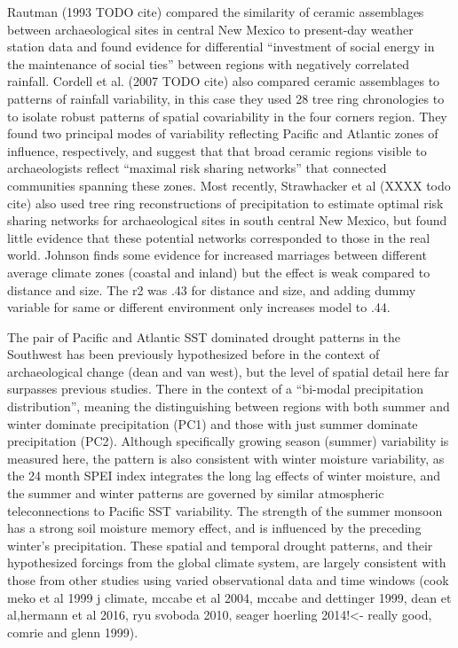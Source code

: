 \documentclass[11pt]{wlscirep}
\begin{document}
Rautman (1993 TODO cite) compared the similarity of ceramic assemblages between archaeological sites in central New Mexico to present-day weather station data and found evidence for differential ``investment of social energy in the maintenance of social ties'' between regions with negatively correlated rainfall. Cordell et al. (2007 TODO cite) also compared ceramic assemblages to patterns of rainfall variability, in this case they used 28 tree ring chronologies to to isolate robust patterns of spatial covariability in the four corners region. They found two principal modes of variability reflecting Pacific and Atlantic zones of influence, respectively, and suggest that that broad ceramic regions visible to archaeologists reflect ``maximal risk sharing networks'' that connected communities spanning these zones. Most recently, Strawhacker et al (XXXX todo cite) also used tree ring reconstructions of precipitation to estimate optimal risk sharing networks for archaeological sites in south central New Mexico, but found little evidence that these potential networks corresponded to those in the real world. Johnson finds some evidence for increased marriages between different average climate zones (coastal and inland) but the effect is weak compared to distance and  size. The r2 was .43 for distance and size, and adding dummy variable for same or different environment only increases model to .44.

The pair of Pacific and Atlantic SST dominated drought patterns in the Southwest has been previously hypothesized before in the context of archaeological change (dean and van west), but the level of spatial detail here far surpasses previous studies. There in the context of a ``bi-modal precipitation distribution'', meaning the distinguishing between regions with both summer and winter dominate precipitation (PC1) and those with just summer dominate precipitation (PC2). Although specifically growing season (summer) variability is measured here, the pattern is also consistent with winter moisture variability, as the 24 month SPEI index integrates the long lag effects of winter moisture, and the summer and winter patterns are governed by similar atmospheric teleconnections to Pacific SST variability. The strength of the summer monsoon has a strong soil moisture memory effect, and is influenced by the preceding winter's precipitation. These spatial and temporal drought patterns, and their hypothesized forcings from the global climate system, are largely consistent with those from other studies using varied observational data and time windows (cook meko et al 1999 j climate, mccabe et al 2004, mccabe and dettinger 1999, dean et al,hermann et al 2016, ryu svoboda 2010, seager hoerling 2014!<- really good, comrie and glenn 1999).
\end{document}
